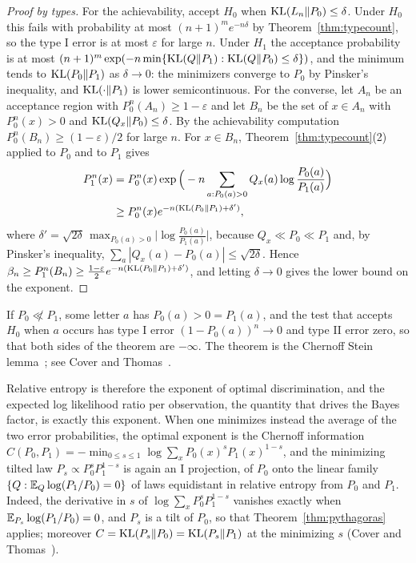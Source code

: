 \begin{proof}[Proof by types]
For the achievability, accept $H_0$ when $\mathrm{KL}(L_n\|P_0)\leq\delta$. Under $H_0$ this fails with probability at most $(n+1)^me^{-n\delta}$ by Theorem~\ref{thm:typecount}, so the type I error is at most $\varepsilon$ for large $n$. Under $H_1$ the acceptance probability is at most $(n+1)^m\exp(-n\min\{\mathrm{KL}(Q\|P_1):\mathrm{KL}(Q\|P_0)\leq\delta\})$, and the minimum tends to $\mathrm{KL}(P_0\|P_1)$ as $\delta\to0$: the minimizers converge to $P_0$ by Pinsker's inequality, and $\mathrm{KL}(\cdot\|P_1)$ is lower semicontinuous. For the converse, let $A_n$ be an acceptance region with $P_0^n(A_n)\geq1-\varepsilon$ and let $B_n$ be the set of $x\in A_n$ with $P_0^n(x)>0$ and $\mathrm{KL}(Q_x\|P_0)\leq\delta$. By the achievability computation $P_0^n(B_n)\geq(1-\varepsilon)/2$ for large $n$. For $x\in B_n$, Theorem~\ref{thm:typecount}(2) applied to $P_0$ and to $P_1$ gives
\[
\begin{aligned}P_1^n(x) &= P_0^n(x)\exp\Big(-n\sum_{a:P_0(a)>0}Q_x(a)\log\frac{P_0(a)}{P_1(a)}\Big)\\ &\geq P_0^n(x)e^{-n(\mathrm{KL}(P_0\|P_1)+\delta')},\end{aligned}
\]
where $\delta' = \sqrt{2\delta}\,\max_{P_0(a)>0}\big|\log\frac{P_0(a)}{P_1(a)}\big|$, because $Q_x\ll P_0\ll P_1$ and, by Pinsker's inequality, $\sum_a|Q_x(a)-P_0(a)|\leq\sqrt{2\delta}$. Hence $\beta_n\geq P_1^n(B_n)\geq\frac{1-\varepsilon}2e^{-n(\mathrm{KL}(P_0\|P_1)+\delta')}$, and letting $\delta\to0$ gives the lower bound on the exponent.
\end{proof}

If $P_0\not\ll P_1$, some letter $a$ has $P_0(a)>0 = P_1(a)$, and the test that accepts $H_0$ when $a$ occurs has type I error $(1-P_0(a))^n\to0$ and type II error zero, so that both sides of the theorem are $-\infty$. The theorem is the Chernoff Stein lemma~\cite{chernoff1956}; see Cover and Thomas~\cite[Section~11.8]{covertomas}.

Relative entropy is therefore the exponent of optimal discrimination, and the expected log likelihood ratio per observation, the quantity that drives the Bayes factor, is exactly this exponent. When one minimizes instead the average of the two error probabilities, the optimal exponent is the Chernoff information~\cite{chernoff1952} $C(P_0,P_1) = -\min_{0\leq s\leq1}\log\sum_xP_0(x)^sP_1(x)^{1-s}$, and the minimizing tilted law $P_s\propto P_0^sP_1^{1-s}$ is again an I projection, of $P_0$ onto the linear family $\{Q:\mathbb{E}_Q\log(P_1/P_0) = 0\}$ of laws equidistant in relative entropy from $P_0$ and $P_1$. Indeed, the derivative in $s$ of $\log\sum_xP_0^sP_1^{1-s}$ vanishes exactly when $\mathbb{E}_{P_s}\log(P_1/P_0) = 0$, and $P_s$ is a tilt of $P_0$, so that Theorem~\ref{thm:pythagoras} applies; moreover $C = \mathrm{KL}(P_s\|P_0) = \mathrm{KL}(P_s\|P_1)$ at the minimizing $s$ (Cover and Thomas~\cite[Section~11.9]{covertomas}).

